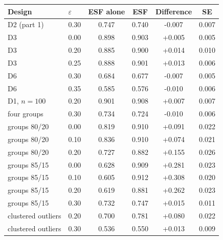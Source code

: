 \begin{tabular}{llcccc}
\toprule
Design & $\varepsilon$ & ESF alone & ESF & Difference & SE \\
\midrule
D2 (part 1) & 0.30 & 0.747 & 0.740 & -0.007 & 0.007 \\
D3 & 0.00 & 0.898 & 0.903 & +0.005 & 0.005 \\
D3 & 0.20 & 0.885 & 0.900 & +0.014 & 0.010 \\
D3 & 0.25 & 0.888 & 0.901 & +0.013 & 0.006 \\
D6 & 0.30 & 0.684 & 0.677 & -0.007 & 0.005 \\
D6 & 0.35 & 0.585 & 0.576 & -0.010 & 0.006 \\
D1, $n=100$ & 0.20 & 0.901 & 0.908 & +0.007 & 0.007 \\
four groups & 0.30 & 0.734 & 0.724 & -0.010 & 0.006 \\
groups 80/20 & 0.00 & 0.819 & 0.910 & +0.091 & 0.022 \\
groups 80/20 & 0.10 & 0.836 & 0.910 & +0.074 & 0.021 \\
groups 80/20 & 0.20 & 0.727 & 0.882 & +0.155 & 0.026 \\
groups 85/15 & 0.00 & 0.628 & 0.909 & +0.281 & 0.023 \\
groups 85/15 & 0.10 & 0.605 & 0.912 & +0.308 & 0.020 \\
groups 85/15 & 0.20 & 0.619 & 0.881 & +0.262 & 0.023 \\
groups 85/15 & 0.30 & 0.732 & 0.747 & +0.015 & 0.011 \\
clustered outliers & 0.20 & 0.700 & 0.781 & +0.080 & 0.022 \\
clustered outliers & 0.30 & 0.536 & 0.550 & +0.013 & 0.009 \\
\bottomrule
\end{tabular}